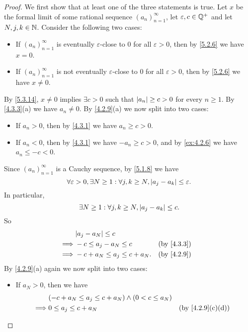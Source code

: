 \begin{proof}
  We first show that at least one of the three statements is true.
  Let \(x\) be the formal limit of some rational sequence \((a_n)_{n = 1}^{\infty}\), let \(\varepsilon, c \in \mathbb{Q}^+\) and let \(N, j, k \in \mathbb{N}\).
  Consider the following two cases:
  \begin{itemize}
    \item If \((a_n)_{n = 1}^{\infty}\) is eventually \(\varepsilon\)-close to \(0\) for all \(\varepsilon > 0\), then by \cref{5.2.6} we have \(x = 0\).
    \item If \((a_n)_{n = 1}^{\infty}\) is not eventually \(\varepsilon\)-close to \(0\) for all \(\varepsilon > 0\), then by \cref{5.2.6} we have \(x \neq 0\).
  \end{itemize}
  By \cref{5.3.14}, \(x \neq 0\) implies \(\exists c > 0\) such that \(\left\lvert a_n\right\rvert \geq c > 0\) for every \(n \geq 1\).
  By \cref{4.3.3}(a) we have \(a_n \neq 0\).
  By \cref{4.2.9}(a) we now split into two cases:
  \begin{itemize}
    \item If \(a_n > 0\), then by \cref{4.3.1} we have \(a_n \geq c > 0\).
    \item If \(a_n < 0\), then by \cref{4.3.1} we have \(-a_n \geq c > 0\), and by \cref{ex:4.2.6} we have \(a_n \leq -c < 0\).
  \end{itemize}
  Since \((a_n)_{n = 1}^{\infty}\) is a Cauchy sequence, by \cref{5.1.8} we have
  \[
    \forall \varepsilon > 0, \exists N \geq 1 : \forall j, k \geq N, \left\lvert a_j - a_k\right\rvert \leq \varepsilon.
  \]
  In particular,
  \[
    \exists N \geq 1 : \forall j, k \geq N, \left\lvert a_j - a_k\right\rvert \leq c.
  \]
  So
  \begin{align*}
             & \abs{a_j - a_N} \leq c                          \\
    \implies & -c \leq a_j - a_N \leq c        &  & \by{4.3.3} \\
    \implies & -c + a_N \leq a_j \leq c + a_N. &  & \by{4.2.9} \\
  \end{align*}
  By \cref{4.2.9}(a) again we now split into two cases:
  \begin{itemize}
    \item If \(a_N > 0\), then we have
          \begin{align*}
                     & (-c + a_N \leq a_j \leq c + a_N) \land (0 < c \leq a_N)                                \\
            \implies & 0 \leq a_j \leq c + a_N                                 &            & \by{4.2.9}[c,d] \\

\end{align*}
\end{itemize}
\end{proof}
